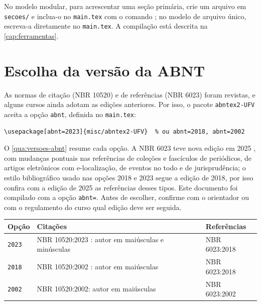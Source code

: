 No modelo modular, para acrescentar uma seção primária, crie um arquivo em \texttt{secoes/} e inclua-o no \texttt{main.tex} com o comando \verb||; no modelo de arquivo único, escreva-a diretamente no \texttt{main.tex}. A compilação está descrita na \autoref{cap:ferramentas}.

\section{Escolha da versão da ABNT}\label{sec:versao-abnt}

As normas de citação (NBR 10520) e de referências (NBR 6023) foram revistas, e alguns cursos ainda adotam as edições anteriores. Por isso, o pacote \texttt{abntex2-UFV} aceita a opção \texttt{abnt}, definida no \texttt{main.tex}:

\begin{verbatim}
\usepackage[abnt=2023]{misc/abntex2-UFV}  % ou abnt=2018, abnt=2002
\end{verbatim}

O \autoref{qua:versoes-abnt} resume cada opção. A NBR 6023 teve nova edição em 2025 \cite{abnt6023-2025}, com mudanças pontuais nas referências de coleções e fascículos de periódicos, de artigos eletrônicos com e-localização, de eventos no todo e de jurisprudência; o estilo bibliográfico usado nas opções 2018 e 2023 segue a edição de 2018, por isso confira com a edição de 2025 as referências desses tipos. Este documento foi compilado com a opção \texttt{abnt=\imprimirversaoabnt}. Antes de escolher, confirme com o orientador ou com o regulamento do curso qual edição deve ser seguida.

\begin{quadro}[htbp]
	\caption{Versões da ABNT disponíveis no modelo}\label{qua:versoes-abnt}
	\centering
	\begin{tabular}{p{}p{}p{}}
		\toprule
		\textbf{Opção} & \textbf{Citações} & \textbf{Referências} \\
		\midrule
		\texttt{2023} & NBR 10520:2023 \cite{abnt10520}: autor em maiúsculas e minúsculas & NBR 6023:2018 \cite{abnt6023} \\
		\texttt{2018} & NBR 10520:2002 \cite{abnt10520-2002}: autor em maiúsculas & NBR 6023:2018 \\
		\texttt{2002} & NBR 10520:2002: autor em maiúsculas & NBR 6023:2002 \cite{abnt6023-2002} \\
		\bottomrule
	\end{tabular}
\end{quadro}

